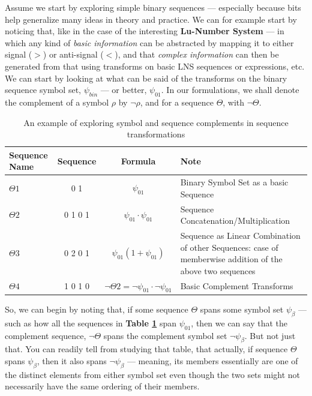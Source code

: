 \documentclass[a4paper, 18pt]{book} %
\begin{document}
Assume we start by exploring simple binary sequences --- especially because bits help generalize many ideas in theory and practice. We can for example start by noticing that, like in the case of the interesting \textbf{Lu-Number System}\cite{lnspaper} --- in which any kind of \textit{basic information} can be abstracted by mapping it to either signal ($>$) or anti-signal ($<$), and that \textit{complex information} can then be generated from that using transforms on basic LNS sequences or expressions, etc. We can start by looking at what can be said of the transforms on the binary sequence symbol set, $\psi_{bin}$ --- or better, $\psi_{01}$. In our formulations, we shall denote the complement of a symbol $\rho$ by $\lnot\rho$, and for a sequence $\Theta$, with $\lnot\Theta$.


\begin{table}[H]
  \centering
  \Large
	\begin{tabular}[t]{|p{2cm}|c|c|p{4cm}|}
	\hline
	Sequence Name & Sequence & Formula & Note\\
	\hline
	\hline
	$\Theta1$ & 0 1 & $\psi_{01}$ & Binary Symbol Set as a basic Sequence\\
	\hline
	$\Theta2$ & 0 1 0 1 & $\psi_{01}\cdot\psi_{01}$ & Sequence Concatenation/Multiplication\\
	\hline
	$\Theta3$ & 0 2 0 1 & $\psi_{01}(1 + \psi_{01})$ & Sequence as Linear Combination of other Sequences: case of memberwise addition of the above two sequences\\
	\hline
	$\Theta4$ & 1 0 1 0 & $\lnot\Theta2 = \lnot\psi_{01} \cdot \lnot\psi_{01}$ & Basic Complement Transforms\\
	\hline
	              
\end{tabular}
 \caption{An example of exploring symbol and sequence complements in sequence transformations}
  \label{TABCOMPLEMENTS}
\end{table}

So, we can begin by noting that, if some sequence $\Theta$ spans some symbol set $\psi_\beta$ --- such as how all the sequences in \textbf{Table \ref{TABCOMPLEMENTS}} span $\psi_{01}$, then we can say that the complement sequence, $\lnot\Theta$ spans the complement symbol set $\lnot\psi_\beta$. But not just that. You can readily tell from studying that table, that actually, if sequence $\Theta$ spans $\psi_\beta$, then it also spans $\lnot\psi_\beta$ --- meaning, its members essentially are one of the distinct elements from either symbol set even though the two sets might not necessarily have the same ordering of their members.
\end{document}
